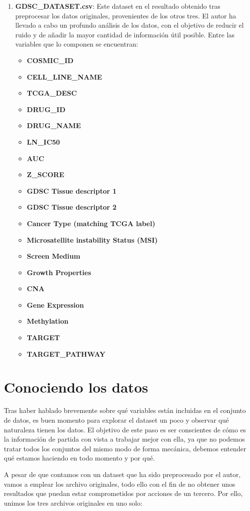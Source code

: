 \begin{enumerate}
    \item \textbf{GDSC\_DATASET.csv}: Este dataset en el resultado obtenido tras preprocesar los datos originales, provenientes de los otros tres. El autor ha llevado a cabo un profundo análisis de los datos, con el objetivo de reducir el ruido y de añadir la mayor cantidad de información útil posible. Entre las variables que lo componen se encuentran:
      \begin{itemize}
          \item \textbf{COSMIC\_ID}
          \item \textbf{CELL\_LINE\_NAME}
          \item \textbf{TCGA\_DESC}
          \item \textbf{DRUG\_ID}
          \item \textbf{DRUG\_NAME}
          \item \textbf{LN\_IC50}
          \item \textbf{AUC}
          \item \textbf{Z\_SCORE}
          \item \textbf{GDSC Tissue descriptor 1}
          \item \textbf{GDSC Tissue descriptor 2}
          \item \textbf{Cancer Type (matching TCGA label)}
          \item \textbf{Microsatellite instability Status (MSI)}
          \item \textbf{Screen Medium}
          \item \textbf{Growth Properties}
          \item \textbf{CNA}
          \item \textbf{Gene Expression}
          \item \textbf{Methylation}
          \item \textbf{TARGET}
          \item \textbf{TARGET\_PATHWAY}
      \end{itemize}
\end{enumerate}


\section{Conociendo los datos}

Tras haber hablado brevemente sobre qué variables están incluidas en el conjunto de datos, es buen momento para explorar el dataset un poco y observar qué naturaleza tienen los datos. El objetivo de este paso es ser conscientes de cómo es la información de partida con vista a trabajar mejor con ella, ya que no podemos tratar todos los conjuntos del mismo modo de forma mecánica, debemos entender qué estamos haciendo en todo momento y por qué.

A pesar de que contamos con un dataset que ha sido preprocesado por el autor, vamos a emplear los archivo originales, todo ello con el fin de no obtener unos resultados que puedan estar comprometidos por acciones de un tercero. Por ello, unimos los tres archivos originales en uno solo:
